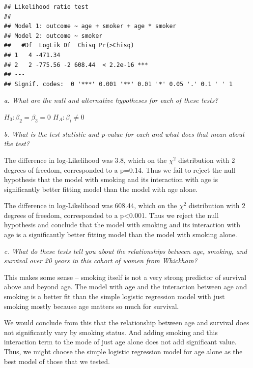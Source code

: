 \documentclass[]{article}
\begin{document}
\begin{verbatim}
## Likelihood ratio test
## 
## Model 1: outcome ~ age + smoker + age * smoker
## Model 2: outcome ~ smoker
##   #Df  LogLik Df  Chisq Pr(>Chisq)    
## 1   4 -471.34                         
## 2   2 -775.56 -2 608.44  < 2.2e-16 ***
## ---
## Signif. codes:  0 '***' 0.001 '**' 0.01 '*' 0.05 '.' 0.1 ' ' 1
\end{verbatim}

\emph{a. What are the null and alternative hypotheses for each of these
tests?}

\(H_0: \beta_2 = \beta_3 = 0\) \(H_A: \beta_i \neq 0\)

\emph{b. What is the test statistic and p-value for each and what does
that mean about the test?}

The difference in log-Likelihood was 3.8, which on the \(\chi^2\)
distribution with 2 degrees of freedom, corresponded to a p=0.14. Thus
we fail to reject the null hypothesis that the model with smoking and
its interaction with age is significantly better fitting model than the
model with age alone.

The difference in log-Likelihood was 608.44, which on the \(\chi^2\)
distribution with 2 degrees of freedom, corresponded to a
p\textless{}0.001. Thus we reject the null hypothesis and conclude that
the model with smoking and its interaction with age is a significantly
better fitting model than the model with smoking alone.

\emph{c. What do these tests tell you about the relationships between
age, smoking, and survival over 20 years in this cohort of women from
Whickham?}

This makes some sense -- smoking itself is not a very strong predictor
of survival above and beyond age. The model with age and the interaction
between age and smoking is a better fit than the simple logistic
regression model with just smoking mostly because age matters so much
for survival.

We would conclude from this that the relationship between age and
survival does not significantly vary by smoking status. And adding
smoking and this interaction term to the mode of just age alone does not
add significant value. Thus, we might choose the simple logistic
regression model for age alone as the best model of those that we
tested.
\end{document}
